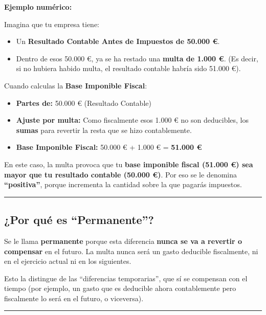 \documentclass[
  paper=a4,
  ,captions=tableheading
]{scrbook}
\providecommand{\tightlist}{%
  \setlength{\itemsep}{0pt}\setlength{\parskip}{0pt}}
\begin{document}
\textbf{Ejemplo numérico:}

Imagina que tu empresa tiene:

\begin{itemize}
\tightlist
\item
  Un \textbf{Resultado Contable Antes de Impuestos de 50.000 €}.
\item
  Dentro de esos 50.000 €, ya se ha restado una \textbf{multa de 1.000
  €}. (Es decir, si no hubiera habido multa, el resultado contable
  habría sido 51.000 €).
\end{itemize}

Cuando calculas la \textbf{Base Imponible Fiscal}:

\begin{itemize}
\tightlist
\item
  \textbf{Partes de:} 50.000 € (Resultado Contable)
\item
  \textbf{Ajuste por multa:} Como fiscalmente esos 1.000 € no son
  deducibles, los \textbf{sumas} para revertir la resta que se hizo
  contablemente.
\item
  \textbf{Base Imponible Fiscal:} 50.000 € + 1.000 € = \textbf{51.000 €}
\end{itemize}

En este caso, la multa provoca que tu \textbf{base imponible fiscal
(51.000 €) sea mayor que tu resultado contable (50.000 €)}. Por eso se
le denomina \textbf{``positiva''}, porque incrementa la cantidad sobre
la que pagarás impuestos.

\begin{center}\rule{0.5\linewidth}{0.5pt}\end{center}

\hypertarget{por-quuxe9-es-permanente}{%
\subsection{¿Por qué es
``Permanente''?}\label{por-quuxe9-es-permanente}}

Se le llama \textbf{permanente} porque esta diferencia \textbf{nunca se
va a revertir o compensar} en el futuro. La multa nunca será un gasto
deducible fiscalmente, ni en el ejercicio actual ni en los siguientes.

Esto la distingue de las ``diferencias temporarias'', que sí se
compensan con el tiempo (por ejemplo, un gasto que es deducible ahora
contablemente pero fiscalmente lo será en el futuro, o viceversa).

\begin{center}\rule{0.5\linewidth}{0.5pt}\end{center}
\end{document}
